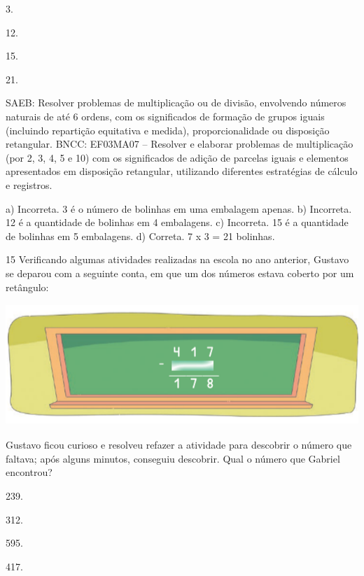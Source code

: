 \begin{multicols}{2}
{\begin{escolha}
{\begin{escolha}

\item
  3.
\item
  12.
\item
  15.
\item
  21.
\end{escolha}

SAEB: Resolver problemas de multiplicação ou de divisão, envolvendo números naturais de até 6 ordens, com os significados de formação de grupos iguais (incluindo repartição equitativa e medida), proporcionalidade ou disposição retangular.
BNCC: EF03MA07 – Resolver e elaborar problemas de multiplicação (por 2, 3, 4, 5 e 10) com os
significados de adição de parcelas iguais e elementos apresentados em disposição retangular,
utilizando diferentes estratégias de cálculo e registros.

a) Incorreta. 3 é o número de bolinhas em uma embalagem apenas.
b) Incorreta. 12 é a quantidade de bolinhas em 4 embalagens.
c) Incorreta. 15 é a quantidade de bolinhas em 5 embalagens.
d) Correta. 7 x 3 = 21 bolinhas.

\num{15} Verificando algumas atividades realizadas na escola no ano anterior, Gustavo se deparou com a seguinte conta, em que um dos números estava
coberto por um retângulo:


\includegraphics[width=5.39213in,height=1.80849in]{media/image141.png}


Gustavo ficou curioso e resolveu refazer a atividade para descobrir o número que faltava; após alguns minutos, conseguiu descobrir. Qual o número que Gabriel encontrou?

\begin{escolha}

\item
  239.
\item
  312.
\item
  595.
\item
  417.
\end{escolha}

}
\end{escolha}}
\end{multicols}
